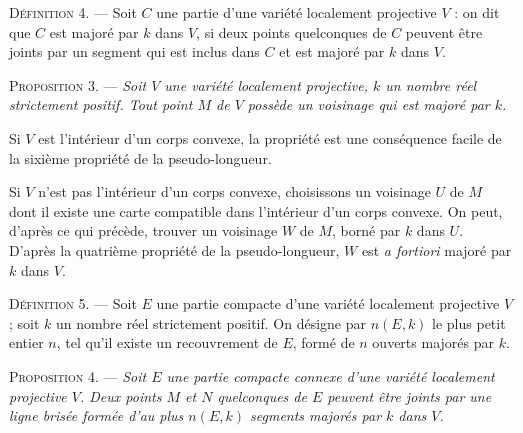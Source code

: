 \documentclass[11pt]{article}
\newcommand{\bzcf}[2]{#1}
\newenvironment{defin}[1][]{\par\medskip\noindent\textsc{Définition #1.} --- }{\par\medskip}
\newenvironment{prop}[1][]{\par\medskip\noindent\textsc{Proposition #1.} --- \itshape}{\par\medskip}
\newenvironment{proof}[1][]{\par}{\par}
\begin{document}
\begin{defin}[4]
Soit $C$ une partie d'une variété localement projective $V$ : on dit que $C$ est majoré par $k$
dans $V$, si deux points quelconques de $C$ peuvent être joints par un segment qui est inclus dans
$C$ et est majoré par $k$ dans $V$.
\end{defin}

\begin{prop}[3]
Soit $V$ une variété localement projective, $k$ un nombre réel strictement positif. Tout point $M$
de $V$ possède un voisinage qui est majoré par $k$.
\end{prop}

\begin{proof}
Si $V$ est l'intérieur d'un corps convexe, la propriété est une conséquence facile de \bzcf{la
sixième propriété de la pseudo-longueur}{\ref{bzthm:c2s2_proprietes_pseudo_longueur}}.

Si $V$ n'est pas l'intérieur d'un corps convexe, choisissons un voisinage $U$ de $M$ dont il
existe une carte compatible dans l'intérieur d'un corps convexe. On peut, d'après ce qui précède,
trouver un voisinage $W$ de $M$, borné par $k$ dans $U$. D'après \bzcf{la quatrième propriété de
la pseudo-longueur}{\ref{bzthm:c2s2_proprietes_pseudo_longueur}}, $W$ est \textit{a fortiori}
majoré par $k$ dans $V$.
\end{proof}

\begin{defin}[5]
Soit $E$ une partie compacte d'une variété localement projective $V$; soit $k$ un nombre réel
strictement positif. On désigne par $n(E, k)$ le plus petit entier $n$, tel qu'il existe un
recouvrement de $E$, formé de $n$ ouverts majorés par $k$.
\end{defin}

\begin{prop}[4]
Soit $E$ une partie compacte connexe d'une variété localement projective $V$. Deux points $M$ et
$N$ quelconques de $E$ peuvent être joints par une ligne brisée formée d'au plus $n(E, k)$
segments majorés par $k$ dans $V$.
\end{prop}
\end{document}
